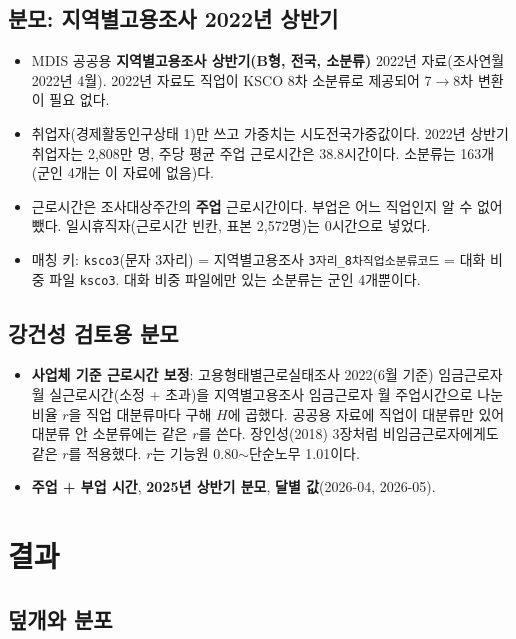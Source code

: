 \documentclass[11pt]{article}
\begin{document}
\subsection{분모: 지역별고용조사 2022년 상반기}

\begin{itemize}[leftmargin=*]
  \item MDIS 공공용 \textbf{지역별고용조사 상반기(B형, 전국, 소분류)} 2022년 자료(조사연월 2022년 4월). 2022년 자료도 직업이 KSCO 8차 소분류로 제공되어 7$\to$8차 변환이 필요 없다.
  \item 취업자(경제활동인구상태 1)만 쓰고 가중치는 시도전국가중값이다. 2022년 상반기 취업자는 2,808만 명, 주당 평균 주업 근로시간은 38.8시간이다. 소분류는 163개(군인 4개는 이 자료에 없음)다.
  \item 근로시간은 조사대상주간의 \textbf{주업} 근로시간이다. 부업은 어느 직업인지 알 수 없어 뺐다. 일시휴직자(근로시간 빈칸, 표본 2,572명)는 0시간으로 넣었다.
  \item 매칭 키: \texttt{ksco3}(문자 3자리) = 지역별고용조사 \texttt{3자리\_8차직업소분류코드} = 대화 비중 파일 \texttt{ksco3}. 대화 비중 파일에만 있는 소분류는 군인 4개뿐이다.
\end{itemize}

\subsection{강건성 검토용 분모}

\begin{itemize}[leftmargin=*]
  \item \textbf{사업체 기준 근로시간 보정}: 고용형태별근로실태조사 2022(6월 기준) 임금근로자 월 실근로시간(소정 + 초과)을 지역별고용조사 임금근로자 월 주업시간으로 나눈 비율 $r$을 직업 대분류마다 구해 $H$에 곱했다. 공공용 자료에 직업이 대분류만 있어 대분류 안 소분류에는 같은 $r$를 쓴다. 장인성(2018) 3장처럼 비임금근로자에게도 같은 $r$를 적용했다. $r$는 기능원 0.80$\sim$단순노무 1.01이다.
  \item \textbf{주업 + 부업 시간}, \textbf{2025년 상반기 분모}, \textbf{달별 값}(2026-04, 2026-05).
\end{itemize}

\section{결과}

\subsection{덮개와 분포}
\end{document}
